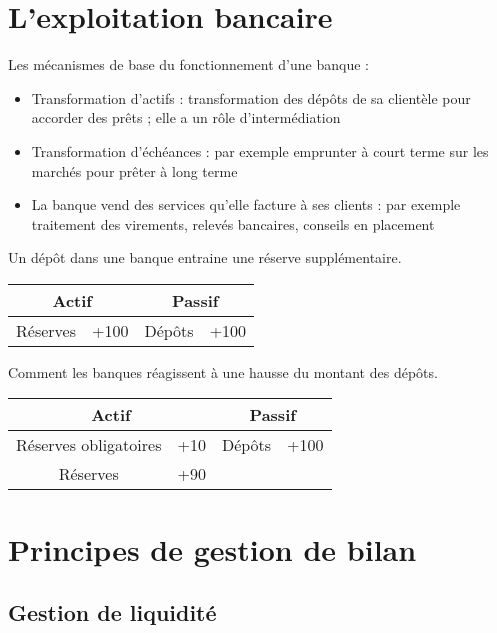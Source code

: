 	\section{L'exploitation bancaire}
	
	Les mécanismes de base du fonctionnement d'une banque :
	
	\begin{itemize}
		\item Transformation d'actifs : transformation des dépôts de sa clientèle pour accorder des prêts ; elle a un rôle d'intermédiation
		\item Transformation d'échéances : par exemple emprunter à court terme sur les marchés pour prêter à long terme
		\item La banque vend des services qu'elle facture à ses clients : par exemple traitement des virements, relevés bancaires, conseils en placement
	\end{itemize}
	
	Un dépôt dans une banque entraine une réserve supplémentaire.
	
\begin{center}
	\begin{tabular}{|c|c|c|c|}
	\hline 
	\multicolumn{2}{|c|}{Actif} & \multicolumn{2}{|c|}{Passif} \\ 
	\hline 
	Réserves & +100 & Dépôts & +100 \\ 
	\hline 
	\end{tabular} 
\end{center}

	Comment les banques réagissent à une hausse du montant des dépôts.
	
	\begin{center}
	\begin{tabular}{|c|c|c|c|}
	\hline 
	\multicolumn{2}{|c|}{Actif} & \multicolumn{2}{|c|}{Passif} \\ 
	\hline 
	Réserves obligatoires & +10 & Dépôts & +100 \\ 
	\hline 
	Réserves & +90 & & \\ 
	\hline 
	\end{tabular} 
\end{center}
	
	\section{Principes de gestion de bilan}
	
	\subsection{Gestion de liquidité}
	
